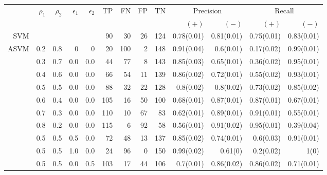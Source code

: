 \documentclass[twoside,11pt]{article}
\begin{document}
          


\begin{table}[htp]
  \centering
    \small\begin{tabular}{rrrrr|rrrrrrrr}
    \hline
    &\multirow{2}{*}{$\rho_1$} & \multirow{2}{*}{$\rho_2$} & \multirow{2}{*}{$\epsilon_1$} & \multirow{2}{*}{$\epsilon_2$} & \multirow{2}{*}{TP}    & \multirow{2}{*}{FN}    & \multirow{2}{*}{FP}    & \multirow{2}{*}{TN} & \multicolumn{2}{c}{Precision} & \multicolumn{2}{c}{Recall}\\
    &&&&&&&&&  $(+)$ &  $(-)$ &  $(+)$ &  $(-)$ \bigstrut\\

\hline
\hline
SVM &       &       &       &       & 90    & 30    & 26    & 124   & 0.78(0.01) & 0.81(0.01) & 0.75(0.01) & 0.83(0.01) \bigstrut\\
\hline
\multirow{13}[2]{*}{ASVM} & 0.2   & 0.8   & 0     & 0     & 20    & 100   & 2     & 148   & 0.91(0.04) & 0.6(0.01) & 0.17(0.02) & 0.99(0.01) \bigstrut[t]\\
      & 0.3   & 0.7   & 0.0   & 0.0   & 44    & 77    & 8     & 143   & 0.85(0.03) & 0.65(0.01) & 0.36(0.02) & 0.95(0.01) \\
      & 0.4   & 0.6   & 0.0   & 0.0   & 66    & 54    & 11    & 139   & 0.86(0.02) & 0.72(0.01) & 0.55(0.02) & 0.93(0.01) \\
      & 0.5   & 0.5   & 0.0   & 0.0   & 88    & 32    & 22    & 128   & 0.8(0.02) & 0.8(0.02) & 0.73(0.02) & 0.85(0.02) \\
      & 0.6   & 0.4   & 0.0   & 0.0   & 105   & 16    & 50    & 100   & 0.68(0.01) & 0.87(0.01) & 0.87(0.01) & 0.67(0.01) \\
      & 0.7   & 0.3   & 0.0   & 0.0   & 110   & 10    & 67    & 83    & 0.62(0.01) & 0.89(0.01) & 0.91(0.01) & 0.55(0.01) \\
      & 0.8   & 0.2   & 0.0   & 0.0   & 115   & 6     & 92    & 58    & 0.56(0.01) & 0.91(0.02) & 0.95(0.01) & 0.39(0.04) \\
      & 0.5   & 0.5   & 0.5   & 0.0   & 72    & 48    & 13    & 137   & 0.85(0.02) & 0.74(0.01) & 0.6(0.03) & 0.91(0.01) \\
      & 0.5   & 0.5   & 1.0   & 0.0   & 24    & 96    & 0     & 150   & 0.99(0.02) & 0.61(0) & 0.2(0.02) & 1(0) \\
      & 0.5   & 0.5   & 0.0   & 0.5   & 103   & 17    & 44    & 106   & 0.7(0.01) & 0.86(0.02) & 0.86(0.02) & 0.71(0.01) \\

\end{tabular}
\end{table}
\end{document}
